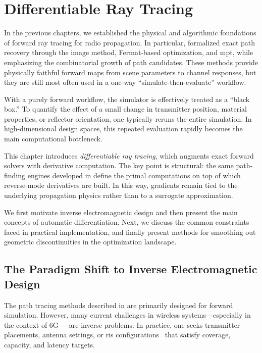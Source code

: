 \chapter{Differentiable Ray Tracing}

In the previous chapters, we established the physical and algorithmic foundations of forward ray tracing for radio propagation. In particular,  formalized exact path recovery through the image method, Fermat-based optimization, and \gls{mpt}, while emphasizing the combinatorial growth of path candidates. These methods provide physically faithful forward maps from scene parameters to channel responses, but they are still most often used in a one-way \enquote{simulate-then-evaluate} workflow.

With a purely forward workflow, the simulator is effectively treated as a \enquote{black box.} To quantify the effect of a small change in transmitter position, material properties, or reflector orientation, one typically reruns the entire simulation. In high-dimensional design spaces, this repeated evaluation rapidly becomes the main computational bottleneck.

This chapter introduces \emph{differentiable ray tracing}, which augments exact forward solvers with derivative computation. The key point is structural: the same path-finding engines developed in  define the primal computations on top of which reverse-mode derivatives are built. In this way, gradients remain tied to the underlying propagation physics rather than to a surrogate approximation.

We first motivate inverse electromagnetic design and then present the main concepts of automatic differentiation. Next, we discuss the common constraints faced in practical implementation, and finally present methods for smoothing out geometric discontinuities in the optimization landscape.

\section{The Paradigm Shift to Inverse Electromagnetic Design}

The path tracing methods described in  are primarily designed for forward simulation. However, many current challenges in wireless systems---especially in the context of 6G~---are inverse problems. In practice, one seeks transmitter placements, antenna settings, or \gls{ris} configurations~ that satisfy coverage, capacity, and latency targets.

